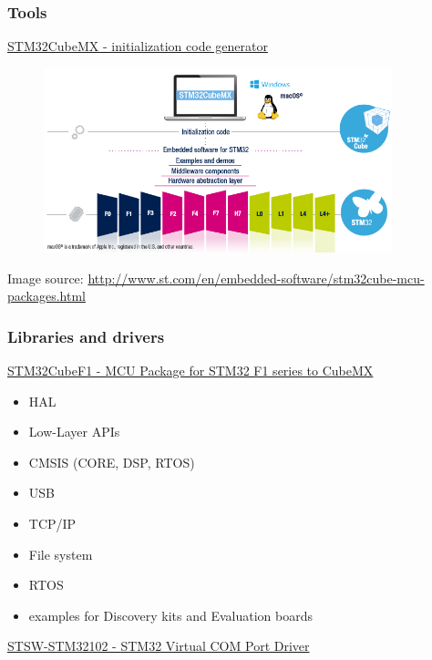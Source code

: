 \documentclass[12;pt,t]{beamer} %
\newcommand{\srctext}[1]{{\fontsize{7}{9}\selectfont\textcolor{sourcesclr}{#1}}}
\begin{document}
\begin{frame}
\frametitle{Tools}  
   	\href{http://www.st.com/en/development-tools/stm32cubemx.html}{STM32CubeMX - initialization code generator}
	\begin{figure}[H]
   		\includegraphics[width=0.9\textwidth]{img/STM32Cube_line_LN1897.jpg}
   	\end{figure}
   	\srctext{Image source: \url{http://www.st.com/en/embedded-software/stm32cube-mcu-packages.html}}
\end{frame}

\begin{frame}
\frametitle{Libraries and drivers}
	\href{http://www.st.com/en/development-tools/stsw-stm32102.html}{STM32CubeF1 - MCU Package for STM32 F1 series to CubeMX}
	\begin{itemize}[label=$\bullet$]
		\item HAL
		\item Low-Layer APIs 
		\item CMSIS (CORE, DSP, RTOS)
		\item USB
		\item TCP/IP
		\item File system
		\item RTOS
		\item examples for Discovery kits and Evaluation boards
	\end{itemize}		\href{http://www.st.com/en/development-tools/stsw-stm32102.html}{STSW-STM32102 - STM32 Virtual COM Port Driver} \\
\end{frame}
\end{document}
